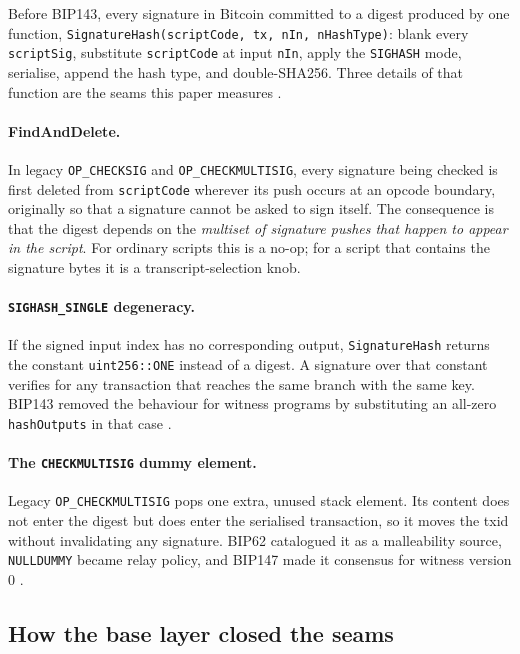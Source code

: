 \documentclass[11pt]{article}
\begin{document}
Before BIP143, every signature in Bitcoin committed to a digest produced by one
function, \texttt{SignatureHash(scriptCode, tx, nIn, nHashType)}: blank every
\texttt{scriptSig}, substitute \texttt{scriptCode} at input \texttt{nIn}, apply
the \texttt{SIGHASH} mode, serialise, append the hash type, and double-SHA256.
Three details of that function are the seams this paper measures
\cite{bitcoincore30src}.

\paragraph{FindAndDelete.} In legacy \texttt{OP\_CHECKSIG} and
\texttt{OP\_CHECKMULTISIG}, every signature being checked is first deleted from
\texttt{scriptCode} wherever its push occurs at an opcode boundary, originally
so that a signature cannot be asked to sign itself. The consequence is that the
digest depends on the \emph{multiset of signature pushes that happen to appear
in the script}. For ordinary scripts this is a no-op; for a script that
contains the signature bytes it is a transcript-selection knob.

\paragraph{\texttt{SIGHASH\_SINGLE} degeneracy.} If the signed input index has
no corresponding output, \texttt{SignatureHash} returns the constant
\texttt{uint256::ONE} instead of a digest. A signature over that constant
verifies for any transaction that reaches the same branch with the same key.
BIP143 removed the behaviour for witness programs by substituting an all-zero
\texttt{hashOutputs} in that case \cite{bip143}.

\paragraph{The \texttt{CHECKMULTISIG} dummy element.} Legacy
\texttt{OP\_CHECKMULTISIG} pops one extra, unused stack element. Its content
does not enter the digest but does enter the serialised transaction, so it moves
the txid without invalidating any signature. BIP62 catalogued it as a
malleability source, \texttt{NULLDUMMY} became relay policy, and BIP147 made it
consensus for witness version 0 \cite{bip62,bip147}.

\subsection{How the base layer closed the seams}
\end{document}
